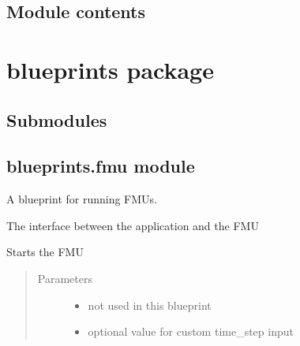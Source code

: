 \documentclass[letterpaper,10pt,english]{sphinxmanual}
\begin{document}
\section{Module contents}
\label{\detokenize{src:module-src}}\label{\detokenize{src:module-contents}}

\chapter{blueprints package}
\label{\detokenize{blueprints:blueprints-package}}\label{\detokenize{blueprints::doc}}

\section{Submodules}
\label{\detokenize{blueprints:submodules}}

\section{blueprints.fmu module}
\label{\detokenize{blueprints:module-files.blueprints.fmu}}\label{\detokenize{blueprints:blueprints-fmu-module}}
A blueprint for running FMUs.

\begin{fulllineitems}
\label{\detokenize{blueprints:files.blueprints.fmu.P}}
The interface between the application and the FMU

\begin{fulllineitems}
\label{\detokenize{blueprints:files.blueprints.fmu.P.start}}
Starts the FMU
\begin{quote}\begin{description}
\item[{Parameters}] \leavevmode\begin{itemize}
\item {} 
 \textendash{} not used in this blueprint

\item {} 
 \textendash{} optional value for custom time\_step input

\end{itemize}

\end{description}\end{quote}

\end{fulllineitems}


\end{fulllineitems}
\end{document}

